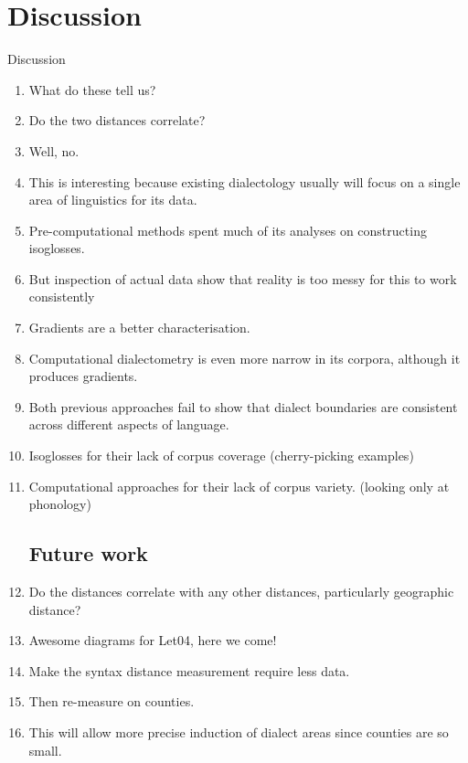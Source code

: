 \documentclass[11pt]{article}
\begin{document}
\section{Discussion}

Discussion
  \begin{enumerate}
  \item What do these tell us?
  \item Do the two distances correlate?
  \item Well, no.
  \item This is interesting because existing dialectology usually will
    focus on a single area of linguistics for its data.
  \item Pre-computational methods spent much of its analyses on
    constructing isoglosses.
  \item But inspection of actual data show that reality is too messy
    for this to work consistently
  \item Gradients are a better characterisation.
  \item Computational dialectometry is even more narrow in its
    corpora, although it produces gradients.
  \item Both previous approaches fail to show that dialect boundaries
    are consistent across different aspects of language.
  \item Isoglosses for their lack of corpus coverage (cherry-picking examples)
  \item Computational approaches for their lack of corpus
    variety. (looking only at phonology)
  \subsection{Future work}
  \item Do the distances correlate with any other distances,
    particularly geographic distance?
  \item Awesome diagrams for Let04, here we come!
  \item Make the syntax distance measurement require less data.
  \item Then re-measure on counties.
  \item This will allow more precise induction of dialect areas since
    counties are so small.
  \end{enumerate}
\end{document}
